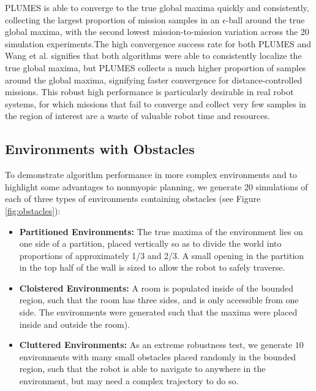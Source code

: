 \documentclass{styles/svproc}
\begin{document}
PLUMES is able to converge to the true global maxima quickly and consistently, collecting the largest proportion of mission samples in an $\epsilon$-ball around the true global maxima, with the second lowest mission-to-mission variation across the 20 simulation experiments.The high convergence success rate for both PLUMES and Wang et al. \cite{wang2017max} signifies that both algorithms were able to consistently localize the true global maxima, but PLUMES collects a much higher proportion of samples around the global maxima, signifying faster convergence for distance-controlled missions. This robust high performance is particularly desirable in real robot systems, for which missions that fail to converge and collect very few samples in the region of interest are a waste of valuable robot time and resources. 






\subsection{Environments with Obstacles}
To demonstrate algorithm performance in more complex environments and to highlight some advantages to nonmyopic planning, we generate 20 simulations of each of three types of environments containing obstacles (see Figure \ref{fig:obstacles}):
\begin{itemize}
\item \textbf{Partitioned Environments:} The true maxima of the environment lies on one side of a partition, placed vertically so as to divide the world into proportions of approximately 1/3 and 2/3. A small opening in the partition in the top half of the wall is sized to allow the robot to safely traverse.
\item \textbf{Cloistered Environments:} A room is populated inside of the bounded region, such that the room has three sides, and is only accessible from one side. The environments were generated such that the maxima were placed inside and outside the room).
\item \textbf{Cluttered Environments:} As an extreme robustness test, we generate $10$ environments with many small obstacles placed randomly in the bounded region, such that the robot is able to navigate to anywhere in the environment, but may need a complex trajectory to do so. 
\end{itemize}
\end{document}
